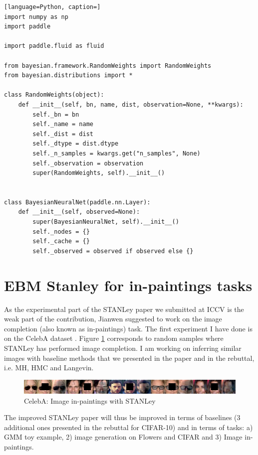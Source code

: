 \documentclass{article}
\begin{document}
\begin{lstlisting}[language=Python, caption=]
import numpy as np
import paddle

import paddle.fluid as fluid

from bayesian.framework.RandomWeights import RandomWeights
from bayesian.distributions import *

class RandomWeights(object):
    def __init__(self, bn, name, dist, observation=None, **kwargs):
        self._bn = bn
        self._name = name
        self._dist = dist
        self._dtype = dist.dtype
        self._n_samples = kwargs.get("n_samples", None)
        self._observation = observation
        super(RandomWeights, self).__init__()


class BayesianNeuralNet(paddle.nn.Layer):
    def __init__(self, observed=None):
        super(BayesianNeuralNet, self).__init__()
        self._nodes = {}
        self._cache = {}
        self._observed = observed if observed else {}        
\end{lstlisting}


\section{EBM Stanley for in-paintings tasks}

As the experimental part of the STANLey paper we submitted at ICCV is the weak part of the contribution, Jianwen suggested to work on the image completion (also known as in-paintings) task.
The first experiment I have done is on the CelebA dataset \citep{liu2018large}.
Figure \ref{fig:anilaceleb} corresponds to random samples where STANLey has performed image completion.
I am working on inferring similar images with baseline methods that we presented in the paper and in the rebuttal, i.e. MH, HMC and Langevin.

\begin{figure}[h]
\centering
\includegraphics[width=\textwidth]{fig/inpaintings.jpg}
\caption{CelebA: Image in-paintings with STANLey}
\label{fig:anilaceleb}
\end{figure}

The improved STANLey paper will thus be improved in terms of baselines (3 additional ones presented in the rebuttal for CIFAR-10) and in terms of tasks: a) GMM toy example, 2) image generation on Flowers and CIFAR and 3) Image in-paintings.
\end{document}
